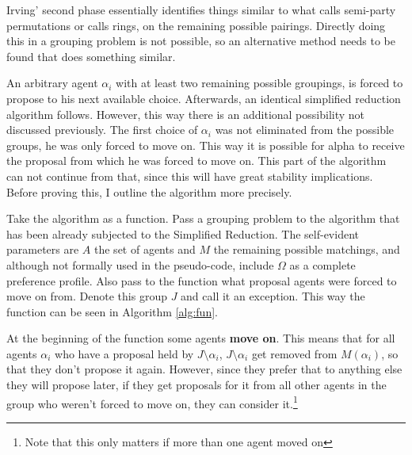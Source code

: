 \documentclass{elsarticle}
\begin{document}
Irving' second phase essentially identifies things similar to what \cite{tan91} calls semi-party permutations or \cite{chung00} calls rings, on the remaining possible pairings. Directly doing this in a grouping problem is not possible, so an alternative method needs to be found that does something similar.

An arbitrary agent $\alpha_i$ with at least two remaining possible groupings, is forced to propose to his next available choice. Afterwards, an identical simplified reduction algorithm follows. However, this way there is an additional possibility not discussed previously. The first choice of $\alpha_i$ was not eliminated from the possible groups, he was only forced to move on. This way it is possible for alpha to receive the proposal from which he was forced to move on. This part of the algorithm can not continue from that, since this will have great stability implications. Before proving this, I outline the algorithm more precisely.

Take the algorithm as a function. Pass a grouping problem to the algorithm that has been already subjected to the Simplified Reduction. The self-evident parameters are $A$ the set of agents and $M$ the remaining possible matchings, and although not formally used in the pseudo-code, include $\Omega$ as a complete preference profile. Also pass to the function what proposal agents were forced to move on from. Denote this group $J$ and call it an exception. This way the function can be seen in Algorithm \ref{alg:fun}.

At the beginning of the function some agents \textbf{move on}. This means that for all agents $\alpha_i$ who have a proposal held by $J \setminus \alpha_i$,  $J \setminus \alpha_i$ get removed from $M(\alpha_i)$, so that they don't propose it again. However, since they prefer that to anything else they will propose later, if they get proposals for it from all other agents in the group who weren't forced to move on, they can consider it.\footnote{Note that this only matters if more than one agent moved on}
\end{document}
